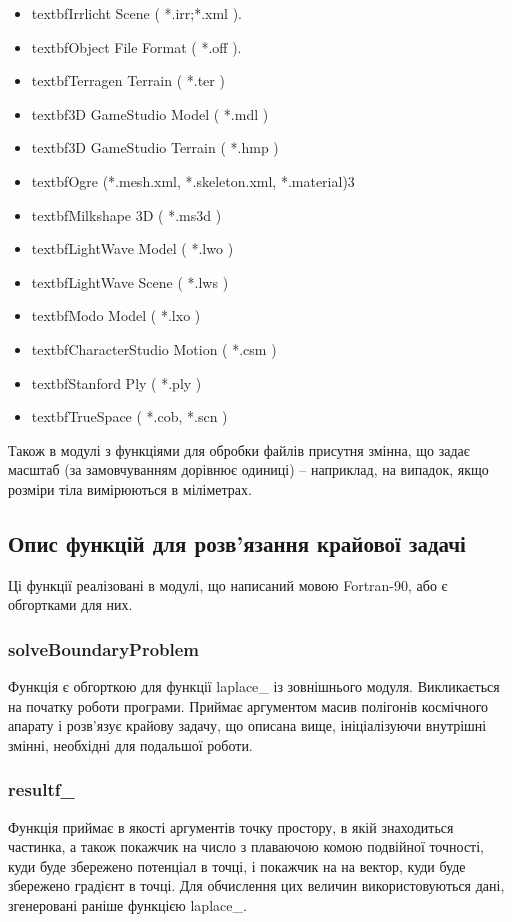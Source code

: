 \documentclass[a4paper,12pt]{article}
\begin{document}
\begin{itemize}
 \item textbf{Irrlicht Scene} ( *.irr;*.xml ).
 \item textbf{Object File Format} ( *.off ).
 \item textbf{Terragen Terrain} ( *.ter )
 \item textbf{3D GameStudio Model} ( *.mdl )
 \item textbf{3D GameStudio Terrain} ( *.hmp )
 \item textbf{Ogre} (*.mesh.xml, *.skeleton.xml, *.material)3
 \item textbf{Milkshape 3D} ( *.ms3d )
 \item textbf{LightWave Model} ( *.lwo )
 \item textbf{LightWave Scene} ( *.lws )
 \item textbf{Modo Model} ( *.lxo )
 \item textbf{CharacterStudio Motion} ( *.csm )
 \item textbf{Stanford Ply} ( *.ply )
 \item textbf{TrueSpace} ( *.cob, *.scn )
\end{itemize}

\bigskip

Також в модулі з функціями для обробки файлів присутня змінна, що задає масштаб (за замовчуванням дорівнює одиниці) -- наприклад, на випадок, якщо розміри тіла вимірюються в міліметрах.

\subsection{Опис функцій для розв’язання крайової задачі}
Ці функції реалізовані в модулі, що написаний мовою Fortran-90, або є обгортками для них.

\subsubsection{solveBoundaryProblem}
Функція є обгорткою для функції laplace\_ із зовнішнього модуля. Викликається на початку роботи програми. Приймає аргументом масив полігонів космічного апарату і розв’язує крайову задачу, що описана вище, ініціалізуючи внутрішні змінні, необхідні для подальшої роботи. 

\subsubsection{resultf\_}
Функція приймає в якості аргументів точку простору, в якій знаходиться частинка, а також покажчик на число з плаваючою комою подвійної точності, куди буде збережено потенціал в точці, і покажчик на на вектор, куди буде збережено градієнт в точці. Для обчислення цих величин використовуються дані, згенеровані раніше функцією laplace\_.
\end{document}
